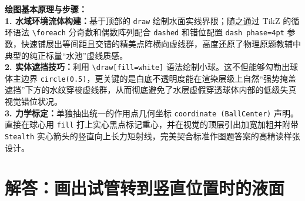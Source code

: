 \documentclass[12pt, a4paper]{ctexrep}
\begin{document}
\vspace{0.6cm}

{\small\color{blue!70!black}
\textbf{绘图基本原理与步骤：}\\
\textbf{1. 水域环境流体构建：}基于顶部的 \texttt{draw} 绘制水面实线界限；随之通过 TikZ 的循环语法 \texttt{\textbackslash foreach} 分奇数和偶数阵列配合 \texttt{dashed} 和错位配置 \texttt{dash phase=4pt} 参数，快速铺展出等间距且交错的精美点阵横向虚线群，高度还原了物理原题教辅中典型的纯正标量“水池”虚线质感。\\
\textbf{2. 实体遮挡技巧：}利用 \texttt{\textbackslash draw[fill=white]} 语法绘制小球。这不但能够勾勒出球体主边界 \texttt{circle(0.5)}，更关键的是白底不透明度能在渲染层级上自然“强势掩盖遮挡”下方的水纹穿梭虚线群，从而彻底避免了水层虚假穿透球体内部的低级失真视觉错位状况。\\
\textbf{3. 力学标定：}单独抽出统一的作用点几何坐标 \texttt{coordinate (BallCenter)} 声明。直接在球心用 \texttt{fill} 打上实心黑点标记重心，并在视觉的顶层引出加宽加粗并附带 \texttt{Stealth} 实心箭头的竖直向上长力矩射线，完美契合标准作图题答案的高精读样张设计。
}

\vspace{1.0cm}


\section{解答：画出试管转到竖直位置时的液面}

\vspace{0.6cm}
\end{document}
